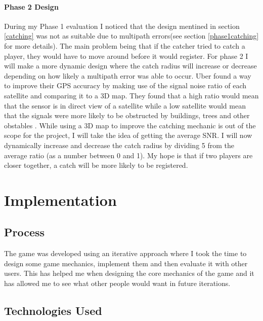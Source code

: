 \documentclass{l4proj}
\begin{document}
\subsubsection{Phase 2 Design}
During my Phase 1 evaluation I noticed that the design mentined in section \ref{catching} was not as suitable due to 
multipath errors(see section \ref{phase1catching} for more details). The main problem being that if the catcher tried
to catch a player, they would have to move around before it would register. For phase 2 I will make a more dynamic design
where the catch radius will increase or decrease depending on how likely a multipath error was able to occur. Uber found
a way to improve their GPS accuracy by making use of the signal noise ratio of each satellite and comparing it to a 3D map.
They found that a high ratio would mean that the sensor is in direct view of a satellite while a low satellite would mean that
the signals were more likely to be obstructed by buildings, trees and other obstables \citep{uberGPS}. While using a 3D map
to improve the catching mechanic is out of the scope for the project, I will take the idea of getting the average SNR. I will
now dynamically increase and decrease the catch radius by dividing 5 from the average ratio (as a number between 0 and 1). My hope
is that if two players are closer together, a catch will be more likely to be registered.
\chapter{Implementation}

\section{Process}
\label{process}
The game was developed using an iterative approach where I took the time to design some game mechanics, implement them and
then evaluate it with other users. This has helped me when designing the core mechanics of the game and it has allowed me
to see what other people would want in future iterations.

\section{Technologies Used}
\end{document}
